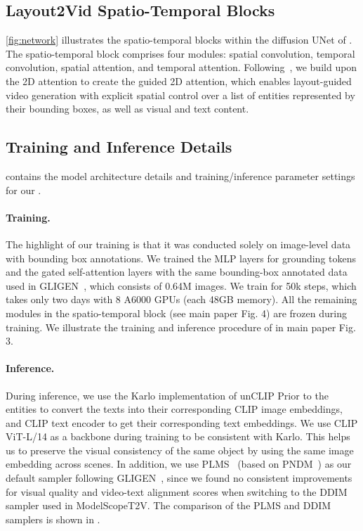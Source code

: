 \subsection{Layout2Vid Spatio-Temporal Blocks}
\label{appendix:spatio-temporal-blocks}
\cref{fig:network} illustrates the spatio-temporal blocks within the diffusion UNet of \videomodule{}.
The spatio-temporal block comprises four modules: spatial convolution, temporal convolution, spatial attention, and temporal attention.
Following~\cite{li2023gligen}, we build upon the 2D attention to create the guided 2D attention, which enables layout-guided video generation 
with explicit spatial control over a list of entities represented by their bounding boxes, as well as visual and text content.

\subsection{Training and Inference Details}\label{appendix:training_inference_details}

 contains the model architecture details and training/inference parameter settings for our \videomodule{}.

\paragraph{Training.} The highlight of our \videomodule{} training is that it was conducted solely on image-level data with bounding box annotations.
We trained the MLP layers for grounding tokens and the gated self-attention layers with the same bounding-box annotated data used in GLIGEN~\citep{li2023gligen}, which consists of 0.64M images. 
We train \videomodule{} for 50k steps, which takes only two days with 8 A6000 GPUs (each 48GB memory). 
All the remaining modules in the spatio-temporal block (see main paper Fig. 4) are frozen during training. 
We illustrate the training and inference procedure of \videomodule{} in main paper Fig. 3. 

\paragraph{Inference.} During inference,
we use the Karlo implementation of unCLIP Prior
to the entities to convert the texts into their corresponding CLIP image embeddings, and CLIP text encoder to get their corresponding text embeddings. We use CLIP ViT-L/14 as a backbone during training to be consistent with Karlo. This helps us to preserve the visual consistency of the same object by using the same image embedding across scenes. In addition, we use PLMS~\cite{stablediffusion} (based on PNDM~\cite{liu2022pseudo}) as our default sampler following GLIGEN~\citep{li2023gligen}, since we found no consistent improvements for visual quality and video-text alignment scores when switching to the DDIM~\citep{song2020denoising} sampler used in ModelScopeT2V. The comparison of the PLMS and DDIM samplers is shown in .



